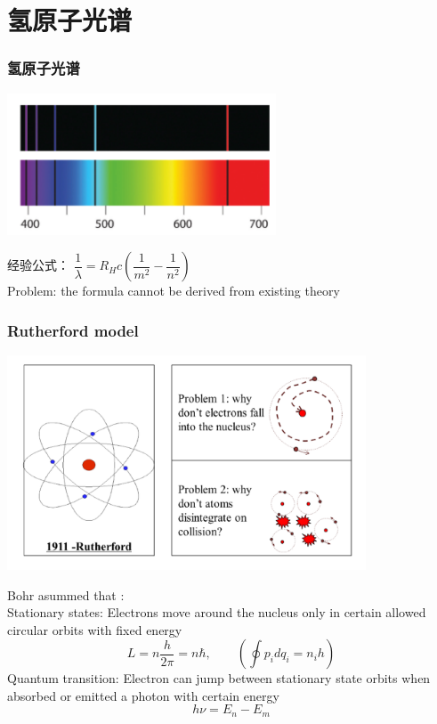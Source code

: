 \section{氢原子光谱}
\begin{frame}  
     \frametitle{氢原子光谱}
     \begin{center}
        \includegraphics[width=0.6\textwidth]{figs/2022-01-17-14-02-45.png}
    \end{center}  
    经验公式：
       $\dfrac{1}{\lambda}=R_H c (\dfrac{1}{m^2} -\dfrac{1}{n^2})$ \\ \vspace{0.3em}
    \alert{Problem:} the formula cannot be derived from existing theory
\end{frame}

\begin{frame} 
    \frametitle{Rutherford model}  
    \begin{center}
        \includegraphics[width=0.8\textwidth]{figs/utherford_atom.png}
    \end{center}  
\end{frame}

\begin{frame}  
    \begin{tcolorbox4}
    Bohr asummed that :\\
    \bullet Stationary states: Electrons move around the nucleus only in certain allowed circular orbits with fixed energy \\
    \[ L=n \frac{h}{2\pi}= n \hbar,\qquad (\oint p_i dq_i = n_i h)\]
    \bullet Quantum transition: Electron can jump between stationary state orbits when absorbed or emitted a photon with certain energy\\
    \[ h\nu=E_n -E_m \]
    \end{tcolorbox4}
\end{frame}

